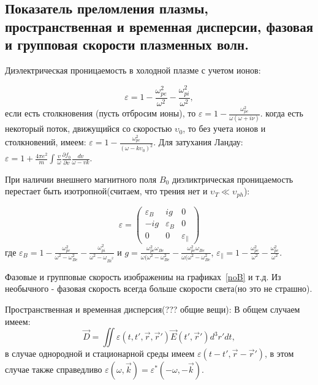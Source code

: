 \documentclass[10pt, a4paper]{article}
\begin{document}
\subsection{Показатель преломления плазмы, пространственная и временная дисперсии, фазовая и групповая скорости плазменных волн.}
\label{sec.7.2}


Диэлектрическая проницаемость в холодной плазме с учетом ионов:

\begin{equation}
    \label{eq.7.7}
    \varepsilon=1 - \frac{\omega_{pe}^2}{\omega^2} - \frac{\omega_{pi}^2}{\omega^2},
\end{equation}
если есть столкновения (пусть отбросим ионы), то $\varepsilon=1-\frac{\omega_{pe}^2}{\omega (\omega+i \nu)}$. когда есть некоторый поток, движущийся со скоростью $\upsilon_0$, то без учета ионов и столкновений, имеем: $\varepsilon=1-\frac{\omega_{pe}^2}{(\omega - k \upsilon_0)^2}$.
Для затухания Ландау: $\varepsilon=1+\frac{4\pi e^2}{m} \int \frac{v}{\omega} \frac{\partial f_0}{\partial v} \frac{dv}{\omega-vk}$.

При наличии внешнего магнитного поля $B_0$ диэликтрическая проницаемость перестает быть изотропной(считаем, что трения нет и $\upsilon_T \ll \upsilon_{ph}$):

\begin{equation}
    \label{eq.7.8}
    \varepsilon=
    \begin{pmatrix}
        \varepsilon_B & ig & 0 \\
        -ig & \varepsilon_B & 0 \\
        0 & 0 & \varepsilon_{\parallel}
    \end{pmatrix}
\end{equation}
 где $\varepsilon_B=1-\frac{\omega_{pe}^2}{\omega^2-\omega_{Be}^2}-\frac{\omega_{pi}^2}{\omega^2-\omega_{Bi^2}}$ и $g=\frac{\omega_{pe}^2 \omega_{Be}}{\omega (\omega^2-\omega_{Be}^2} -\frac{\omega_{pe}^2 \omega_{Be}}{\omega (\omega^2-\omega_{Be}^2}$, $\varepsilon_{\parallel}=1-\frac{\omega_{pe}^2}{\omega^2}-\frac{\omega_{pe}^2}{\omega^2}$. 

Фазовые и групповые скорость изображениы на графиках~\ref{noB} и т.д. Из необычного - фазовая скорость всегда больше скорости света(но это не страшно). 

Пространственная и временная дисперсия(??? общие вещи):
В общем случаем имеем:
\begin{equation}
    \label{eq.7.8}
    \overrightarrow{D}=\iint \varepsilon(t,t',\overrightarrow{r},\overrightarrow{r}') \overrightarrow{E}(t',\overrightarrow{r}') d^3 r' dt,
\end{equation}
в случае однородной и стационарной среды имеем $\varepsilon(t-t', \overrightarrow{r}-\overrightarrow{r}')$, в этом случае
также справедливо $\varepsilon(\omega, \overrightarrow{k})= \varepsilon^*(-\omega, -\overrightarrow{k})$.
\end{document}
